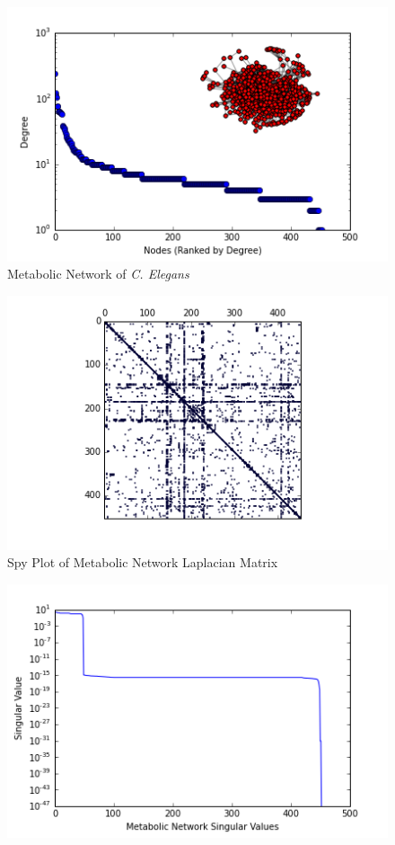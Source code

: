 \documentclass{article}
\begin{document}
\begin{figure}
\centering

\includegraphics[width=\linewidth]{meta_degree_histogram.png}
\caption{Metabolic Network of \textit{C. Elegans}}
  
\end{figure}
\begin{figure}
\centering
\includegraphics[width = \linewidth]{metaspy.png}
\caption{Spy Plot of Metabolic Network Laplacian Matrix}
\end{figure}
\begin{figure}
\centering
\includegraphics[width = \linewidth]{metasing.png}
\end{figure}
\end{document}

